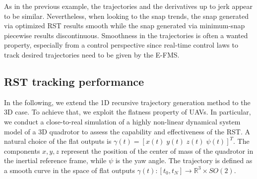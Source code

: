 As in the previous example, the trajectories and the derivatives up to jerk appear to be similar. Nevertheless, when looking to the snap trends, the snap generated via optimized RST results smooth while the snap generated via minimum-snap piecewise results discontinuous. Smoothness in the trajectories is often a wanted property, especially from a control perspective since real-time control laws to track desired trajectories need to be given by the E-FMS. 

\subsection{RST tracking performance}
In the following, we extend the 1D recursive trajectory generation method to the 3D case. To achieve that, we exploit the flatness property \cite{6324664} of UAVs.
In particular, we conduct a close-to-real simulation of a highly non-linear dynamical system model of a 3D quadrotor \cite{1570447} to assess the capability and effectiveness of the RST. 
A natural choice of the flat outputs is $\gamma(t) = [x(t)\; y(t)\; z(t)\; \psi(t)]^T$. The components $x,y,z$ represent the position of the center of mass of the quadrotor in the inertial reference frame, while $\psi$ is the yaw angle. The trajectory is defined as a smooth curve in the space of flat outputs $\gamma(t): [t_0,t_N] \to \mathbb{R}^3 \times SO(2)$. 

